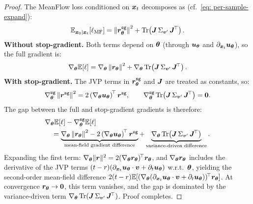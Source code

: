 \begin{appendices}
    \begin{proof}
        The MeanFlow loss conditioned on ${\bm{x}}_{t}$ decomposes as (cf.~\eqref{eq: per-sample-expand}):
        \begin{equation}
            \mathbb{E}_{{\bm{x}}_{0}\mid{\bm{x}}_{t}}\!\left[\ell_{\text{MF}}\right]=\left\|{\bm{r}}_{{\bm{\theta}}}^{\texttt{sg}}\right\|^{2}+\operatorname{Tr}\!\left({\bm{J}}\,\Sigma_{{\bm{v}}^{\prime}}\,{\bm{J}}^{\!\top}\right).
            \label{eq: cond-loss-decomp}
        \end{equation}
        \textbf{Without stop-gradient.} Both terms depend on ${\bm{\theta}}$ (through ${\bm{u}}_{{\bm{\theta}}}$ and $\partial_{{\bm{x}}_{t}}{\bm{u}}_{{\bm{\theta}}}$), so the full gradient is:
        \begin{equation}
            \nabla_{{\bm{\theta}}}\mathbb{E}\!\left[\ell\right]=\nabla_{{\bm{\theta}}}\left\|{\bm{r}}_{{\bm{\theta}}}\right\|^{2}+\nabla_{{\bm{\theta}}}\operatorname{Tr}\!\left({\bm{J}}\,\Sigma_{{\bm{v}}^{\prime}}\,{\bm{J}}^{\!\top}\right).
        \end{equation}
        \textbf{With stop-gradient.} The JVP terms in ${\bm{r}}_{{\bm{\theta}}}^{\texttt{sg}}$ and ${\bm{J}}$ are treated as constants, so:
        \begin{equation}
            \nabla_{{\bm{\theta}}}^{\texttt{sg}}\left\|{\bm{r}}^{\texttt{sg}}\right\|^{2}=2\left(\nabla_{{\bm{\theta}}}{\bm{u}}_{{\bm{\theta}}}\right)^{\!\top}{\bm{r}}^{\texttt{sg}},\qquad
            \nabla_{{\bm{\theta}}}^{\texttt{sg}}\operatorname{Tr}\!\left({\bm{J}}\,\Sigma_{{\bm{v}}^{\prime}}\,{\bm{J}}^{\!\top}\right)=\bm{0}.
        \end{equation}
        The gap between the full and stop-gradient gradients is therefore:
        \begin{align}
            &\nabla_{{\bm{\theta}}}\mathbb{E}\!\left[\ell\right]-\nabla_{{\bm{\theta}}}^{\texttt{sg}}\mathbb{E}\!\left[\ell\right] \nonumber\\
            &\quad=\underbrace{\nabla_{{\bm{\theta}}}\left\|{\bm{r}}_{{\bm{\theta}}}\right\|^{2}-2\left(\nabla_{{\bm{\theta}}}{\bm{u}}_{{\bm{\theta}}}\right)^{\!\top}{\bm{r}}^{\texttt{sg}}}_{\text{mean-field gradient difference}}+\underbrace{\nabla_{{\bm{\theta}}}\operatorname{Tr}\!\left({\bm{J}}\,\Sigma_{{\bm{v}}^{\prime}}\,{\bm{J}}^{\!\top}\right)}_{\text{variance-driven difference}}.
        \end{align}
        Expanding the first term: $\nabla_{{\bm{\theta}}}\|{\bm{r}}\|^{2}=2(\nabla_{{\bm{\theta}}}{\bm{r}}_{{\bm{\theta}}})^{\!\top}{\bm{r}}_{{\bm{\theta}}}$, and $\nabla_{{\bm{\theta}}}{\bm{r}}_{{\bm{\theta}}}$ includes the derivative of the JVP terms $(t-r)(\partial_{{\bm{x}}_{t}}{\bm{u}}_{{\bm{\theta}}}\cdot{\bm{v}}+\partial_{t}{\bm{u}}_{{\bm{\theta}}})$ w.r.t.\ ${\bm{\theta}}$, yielding the second-order mean-field difference $2(t-r)\mathbb{E}[(\nabla_{{\bm{\theta}}}(\partial_{{\bm{x}}_{t}}{\bm{u}}_{{\bm{\theta}}}\cdot{\bm{v}}+\partial_{t}{\bm{u}}_{{\bm{\theta}}}))^{\!\top}{\bm{r}}_{{\bm{\theta}}}]$. At convergence ${\bm{r}}_{{\bm{\theta}}}\to\bm{0}$, this term vanishes, and the gap is dominated by the variance-driven term $\nabla_{{\bm{\theta}}}\operatorname{Tr}({\bm{J}}\,\Sigma_{{\bm{v}}^{\prime}}\,{\bm{J}}^{\!\top})$. Proof completes.
    \end{proof}


\end{appendices}
